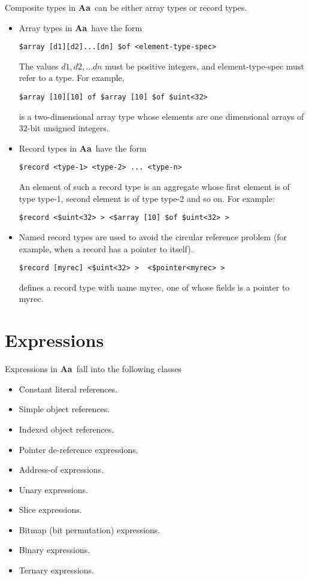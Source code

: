 \documentclass{article}
\newcommand{\Aa}{{\bf Aa}~}
\begin{document}
Composite types in \Aa can be either
array types or record types.
\begin{itemize}
\item 
Array types in \Aa have the form
\begin{verbatim}
$array [d1][d2]...[dn] $of <element-type-spec>
\end{verbatim} %
The values $ d1,d2, \ldots dn$ must
be positive integers, and element-type-spec
must refer to a type.
For example, 
\begin{verbatim}
$array [10][10] of $array [10] $of $uint<32>
\end{verbatim}
is a two-dimensional array type whose
elements are one dimensional arrays of 32-bit
unsigned integers.
\item
Record types in \Aa have the form
\begin{verbatim}
$record <type-1> <type-2> ... <type-n>
\end{verbatim}
An element of such a record type is
an aggregate whose first element is of type
type-1, second element is of type type-2 and so on.
For example:
\begin{verbatim}
$record <$uint<32> > <$array [10] $of $uint<32> > 
\end{verbatim}
\item Named record types are used to avoid the circular
reference problem (for example, when a record has a pointer to
itself).
\begin{verbatim}
$record [myrec] <$uint<32> >  <$pointer<myrec> >
\end{verbatim}
defines a record type with name myrec, one of whose
fields is a pointer to myrec.
\end{itemize}



\section{Expressions} \label{sec:Expressions}


Expressions in \Aa fall into the following classes
\begin{itemize}
\item Constant literal references.
\item Simple object references.
\item Indexed object references.
\item Pointer de-reference expressions.
\item Address-of expressions.
\item Unary expressions.
\item Slice expressions.
\item Bitmap (bit permutation) expressions.
\item Binary expressions.
\item Ternary expressions.
\end{itemize}
\end{document}
